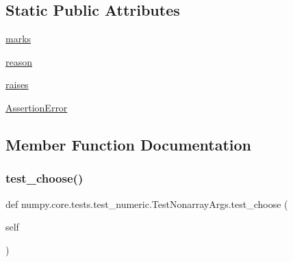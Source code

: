 \subsection*{Static Public Attributes}
\begin{DoxyCompactItemize}
\item 
\hyperlink{classnumpy_1_1core_1_1tests_1_1test__numeric_1_1TestNonarrayArgs_aecd637cfdb74ec4ae2ea88472bc1c2ee}{marks}
\item 
\hyperlink{classnumpy_1_1core_1_1tests_1_1test__numeric_1_1TestNonarrayArgs_acc9c6d079fcaf84786d4ab429b090656}{reason}
\item 
\hyperlink{classnumpy_1_1core_1_1tests_1_1test__numeric_1_1TestNonarrayArgs_a4ff43ae675d8c293aa3fac1730a2ce90}{raises}
\item 
\hyperlink{classnumpy_1_1core_1_1tests_1_1test__numeric_1_1TestNonarrayArgs_aa0fcb526177e932f124e36da21df3200}{Assertion\+Error}
\end{DoxyCompactItemize}


\subsection{Member Function Documentation}
\mbox{\label{classnumpy_1_1core_1_1tests_1_1test__numeric_1_1TestNonarrayArgs_a2a731140d060fd67d57403d519640b66}} 
\subsubsection{\texorpdfstring{test\+\_\+choose()}{test\_choose()}}
{\footnotesize\ttfamily def numpy.\+core.\+tests.\+test\+\_\+numeric.\+Test\+Nonarray\+Args.\+test\+\_\+choose (\begin{DoxyParamCaption}\item[{}]{self }\end{DoxyParamCaption})}

\mbox{\label{classnumpy_1_1core_1_1tests_1_1test__numeric_1_1TestNonarrayArgs_af1c6a82cda33771ce2fdfeb58a4b7b7f}} 
